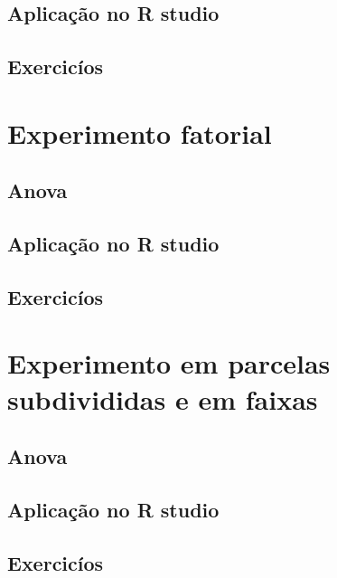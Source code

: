 \documentclass[
]{book}
\begin{document}
\hypertarget{aplicauxe7uxe3o-no-r-studio-10}{%
\section{Aplicação no R studio}\label{aplicauxe7uxe3o-no-r-studio-10}}

\hypertarget{exercicuxedos-10}{%
\section{Exercicíos}\label{exercicuxedos-10}}

\hypertarget{experimento-fatorial}{%
\chapter{Experimento fatorial}\label{experimento-fatorial}}

\hypertarget{anova-3}{%
\section{Anova}\label{anova-3}}

\hypertarget{aplicauxe7uxe3o-no-r-studio-11}{%
\section{Aplicação no R studio}\label{aplicauxe7uxe3o-no-r-studio-11}}

\hypertarget{exercicuxedos-11}{%
\section{Exercicíos}\label{exercicuxedos-11}}

\hypertarget{experimento-em-parcelas-subdivididas-e-em-faixas}{%
\chapter{Experimento em parcelas subdivididas e em faixas}\label{experimento-em-parcelas-subdivididas-e-em-faixas}}

\hypertarget{anova-4}{%
\section{Anova}\label{anova-4}}

\hypertarget{aplicauxe7uxe3o-no-r-studio-12}{%
\section{Aplicação no R studio}\label{aplicauxe7uxe3o-no-r-studio-12}}

\hypertarget{exercicuxedos-12}{%
\section{Exercicíos}\label{exercicuxedos-12}}
\end{document}
